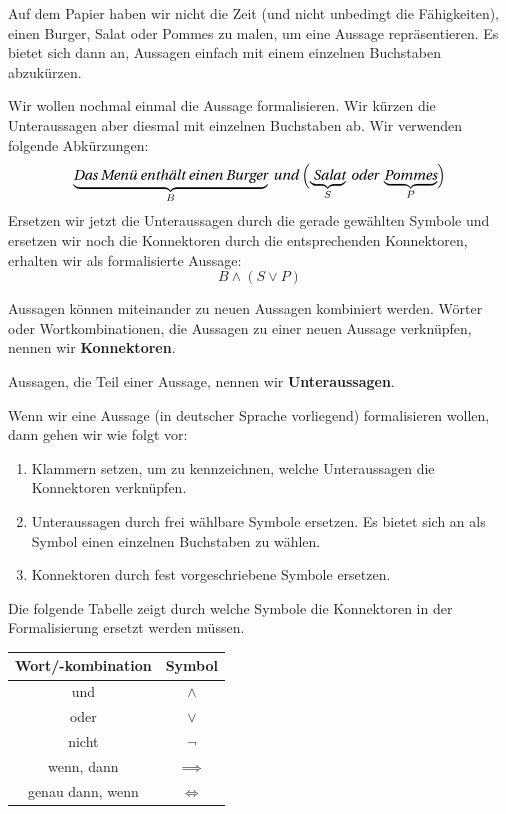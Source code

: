 \documentclass[../../main.tex]{subfiles}
\begin{document}
Auf dem Papier haben wir nicht die Zeit (und nicht unbedingt die Fähigkeiten), einen Burger, Salat oder Pommes zu malen, um eine Aussage repräsentieren. Es bietet sich dann an, Aussagen einfach mit einem einzelnen Buchstaben abzukürzen. 
 
 \begin{example}{}
 Wir wollen nochmal einmal die Aussage  formalisieren. Wir kürzen die Unteraussagen aber diesmal mit einzelnen Buchstaben ab. Wir verwenden folgende Abkürzungen:
     \[\underbrace{\statement{Das Menü enthält einen Burger}}_{B}\statement{~und~}\Bigl(\underbrace{\statement{ Salat}}_{S}\statement{~oder~}\underbrace{\statement{Pommes}}_{P}\Bigr)\]
Ersetzen wir jetzt die Unteraussagen durch die gerade gewählten Symbole und ersetzen wir noch die Konnektoren durch die entsprechenden Konnektoren, erhalten wir als formalisierte Aussage:
    \[B \land (S \lor P)\]
 \end{example}

\begin{nutshell}

   Aussagen können miteinander zu neuen Aussagen kombiniert werden. Wörter oder Wortkombinationen, die Aussagen zu einer neuen Aussage verknüpfen, nennen wir \textbf{Konnektoren}.
   
   Aussagen, die Teil einer Aussage, nennen wir \textbf{Unteraussagen}.\bigskip
   
   Wenn wir eine Aussage (in deutscher Sprache vorliegend) formalisieren wollen, dann gehen wir wie folgt vor:
   \begin{enumerate}
       \item Klammern setzen, um zu kennzeichnen, welche Unteraussagen die Konnektoren verknüpfen.
       \item Unteraussagen durch frei wählbare Symbole ersetzen. Es bietet sich an als Symbol einen einzelnen Buchstaben zu wählen.
       \item Konnektoren durch fest vorgeschriebene Symbole ersetzen.
   \end{enumerate}
   
    Die folgende Tabelle zeigt durch welche Symbole die Konnektoren in der Formalisierung ersetzt werden müssen.
    
   \begin{center}
       \begin{tabular}{cc}\toprule
            Wort/-kombination & Symbol\\\midrule
            und &  $\land$\\
            oder&  $\lor$\\
            nicht & $\lnot$\\
            wenn, dann& $\implies$\\
            genau dann, wenn&  $\iff$\\\bottomrule
        \end{tabular}
    \end{center}
\end{nutshell}
    
\end{document}
